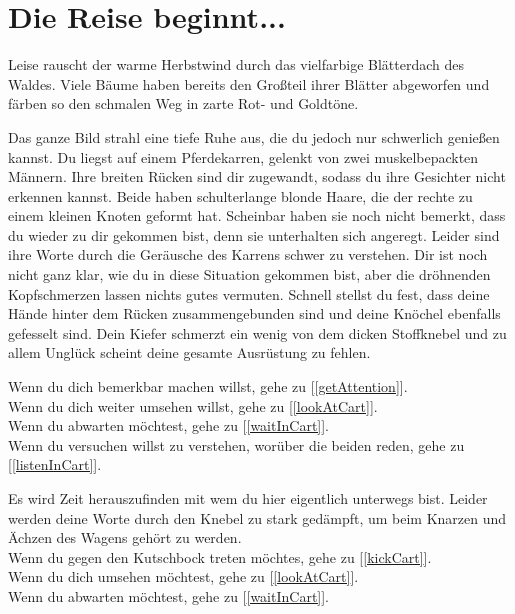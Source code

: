 \chapter*{Die Reise beginnt...}

Leise rauscht der warme Herbstwind durch das vielfarbige Blätterdach des Waldes. Viele Bäume haben bereits den Großteil ihrer Blätter abgeworfen und färben so den schmalen Weg in zarte Rot- und Goldtöne.

Das ganze Bild strahl eine tiefe Ruhe aus, die du jedoch nur schwerlich genießen kannst. Du liegst auf einem Pferdekarren, gelenkt von zwei muskelbepackten Männern. Ihre breiten Rücken sind dir zugewandt, sodass du ihre Gesichter nicht erkennen kannst. Beide haben schulterlange blonde Haare, die der rechte zu einem kleinen Knoten geformt hat. Scheinbar haben sie noch nicht bemerkt, dass du wieder zu dir gekommen bist, denn sie unterhalten sich angeregt. Leider sind ihre Worte durch die Geräusche des Karrens schwer zu verstehen. Dir ist noch nicht ganz klar, wie du in diese Situation gekommen bist, aber die dröhnenden Kopfschmerzen lassen nichts gutes vermuten. Schnell stellst du fest, dass deine Hände hinter dem Rücken zusammengebunden sind und deine Knöchel ebenfalls gefesselt sind. Dein Kiefer schmerzt ein wenig von dem dicken Stoffknebel und zu allem Unglück scheint deine gesamte Ausrüstung zu fehlen.

Wenn du dich bemerkbar machen willst, gehe zu [\ref{getAttention}].
\\Wenn du dich weiter umsehen willst, gehe zu [\ref{lookAtCart}].
\\Wenn du abwarten möchtest, gehe zu [\ref{waitInCart}].
\\Wenn du versuchen willst zu verstehen, worüber die beiden reden, gehe zu [\ref{listenInCart}].


Es wird Zeit herauszufinden mit wem du hier eigentlich unterwegs bist. Leider werden deine Worte durch den Knebel zu stark gedämpft, um beim Knarzen und Ächzen des Wagens gehört zu werden.
\\Wenn du gegen den Kutschbock treten möchtes, gehe zu [\ref{kickCart}].
\\Wenn du dich umsehen möchtest, gehe zu [\ref{lookAtCart}].
\\Wenn du abwarten möchtest, gehe zu [\ref{waitInCart}].


